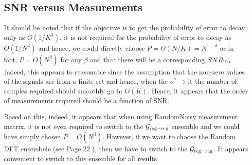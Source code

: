 \documentclass[journal,draft,onecolumn]{IEEEtran}
\begin{document}
\subsection{SNR versus Measurements}
It should be noted that if the objective is to get the probability of error to decay only as $O(1/K^3)$, it is not required for the probability of error to decay as $O(1/N^3)$ and hence, we could directly choose $P = O(N/K) = N^{1-\delta}$ or in fact, $P = O(N^\beta)$ for any $\beta$ and that there will be a corresponding $SNR_{\rm Th}$. Indeed, this appears to reasonable since the assumption that the non-zero values of the signals are from a finite set and hence, when the $\sigma^2 \rightarrow 0$, the number of samples required should smoothly go to $O(K)$. Hence, it appears that the order of measurements required should be a function of SNR.

Based on this, indeed, it appears that when using RandomNoisy measurement matrix, it is not even required to switch to the $\mathcal{G}_{\rm reg-reg}$ ensemble and we could have simply chosen $P = O(N^\beta)$. However, if we want to choose the Random DFT ensembele (see Page 22 \cite{li2015subdraft}), then we have to switch to the $\mathcal{G}_{\rm reg-reg}$. It appears convenient to switch to this ensemble for all results
\end{document}
